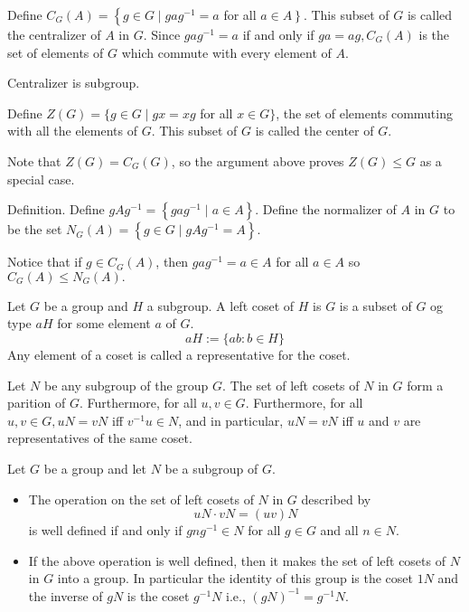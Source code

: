 \begin{definition}[Centralizer]
    Define $C_{G}(A)=\left\{g \in G \mid g a g^{-1}=a\right.$ for all $\left.a \in A\right\}$. This subset of $G$ is called the centralizer of $A$ in $G$. Since $g a g^{-1}=a$ if and only if $g a=a g, C_{G}(A)$ is the set of elements of $G$ which commute with every element of $A$.
\end{definition}
\begin{remark}
    Centralizer is subgroup.
\end{remark}
\begin{definition}[Center]
    Define $Z(G)=\{g \in G \mid g x=x g$ for all $x \in G\}$, the set of elements commuting with all the elements of $G .$ This subset of $G$ is called the center of $G .$
\end{definition}
\begin{remark}
    Note that $Z(G)=C_{G}(G)$, so the argument above proves $Z(G) \leq G$ as a special case.
\end{remark}
\begin{definition}[Normalizer]
    Definition. Define $g A g^{-1}=\left\{g a g^{-1} \mid a \in A\right\}$. Define the normalizer of $A$ in $G$ to be the set $N_{G}(A)=\left\{g \in G \mid g A g^{-1}=A\right\}$.
\end{definition}
\begin{remark}
    Notice that if $g \in C_{G}(A)$, then $g a g^{-1}=a \in A$ for all $a \in A$ so $C_{G}(A) \leq N_{G}(A) .$ 
\end{remark}

\begin{definition}[Coset]
    Let $G$ be a group and $H$ a subgroup. A left coset of $H$ is $G$ is a subset of $G$ og type $aH$ for some element $a$ of $G$.
    \[aH:=\{ab:b\in H\}\]Any element of a coset is called a representative for the coset.
\end{definition}
\begin{lemma}
    Let $N$ be any subgroup of the group $G$. The set of left cosets of $N$ in $G$ form a parition of $G$. Furthermore, for all $u,v\in G$. Furthermore, for all $u,v\in G, uN = vN$ iff  $v^{-1}u \in N$, and in particular, $uN = vN$ iff $u$ and $v$ are representatives of the same coset.
\end{lemma}

\begin{proposition}
   Let $G$ be a group and let $N$ be a subgroup of $G$.\begin{itemize}
    \item The operation on the set of left cosets of $N$ in $G$ described by
    $$
    u N \cdot v N=(u v) N
    $$
    is well defined if and only if $g n g^{-1} \in N$ for all $g \in G$ and all $n \in N$.
    \item  If the above operation is well defined, then it makes the set of left cosets of $N$ in $G$ into a group. In particular the identity of this group is the coset $1 N$ and the inverse of $g N$ is the coset $g^{-1} N$ i.e., $(g N)^{-1}=g^{-1} N$.
   \end{itemize}
\end{proposition}

